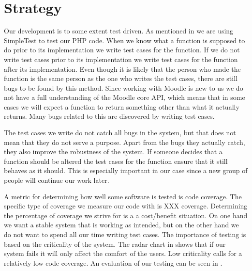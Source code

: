 \section{Strategy}
\label{sec:strategy}
Our development is to some extent test driven.
As mentioned in  we are using SimpleTest to test our PHP code.
When we know what a function is supposed to do prior to its implementation we write test cases for the function.
If we do not write test cases prior to its implementation we write test cases for the function after its implementation.
Even though it is likely that the person who made the function is the same person as the one who writes the test cases, there are still bugs to be found by this method.
Since working with Moodle is new to us we do not have a full understanding of the Moodle core API, which means that in some cases we will expect a function to return something other than what it actually returns.
Many bugs related to this are discovered by writing test cases.

The test cases we write do not catch all bugs in the system, but that does not mean that they do not serve a purpose.
Apart from the bugs they actually catch, they also improve the robustness of the system.
If someone decides that a function should be altered the test cases for the function ensure that it still behaves as it should.
This is especially important in our case since a new group of people will continue our work later.

A metric for determining how well some software is tested is code coverage. 
The specific type of coverage we measure our code with is XXX coverage. 
Determining the percentage of coverage we strive for is a a cost/benefit situation.
On one hand we want a stable system that is working as intended, but on the other hand we do not want to spend all our time writing test cases.
The importance of testing is based on the criticality of the system.
The radar chart in  shows that if our system fails it will only affect the comfort of the users.
Low criticality calls for a relatively low code coverage.
An evaluation of our testing can be seen in .